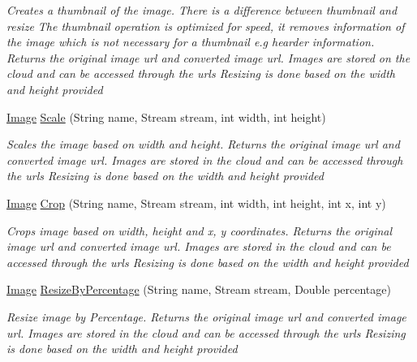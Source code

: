 \begin{DoxyCompactItemize}
\begin{DoxyCompactList}\small\item\em Creates a thumbnail of the image. There is a difference between thumbnail and resize The thumbnail operation is optimized for speed, it removes information of the image which is not necessary for a thumbnail e.\+g hearder information. Returns the original image url and converted image url. Images are stored on the cloud and can be accessed through the urls Resizing is done based on the width and height provided \end{DoxyCompactList}\item 
\hyperlink{classcom_1_1shephertz_1_1app42_1_1paas_1_1sdk_1_1csharp_1_1image_processor_1_1_image}{Image} \hyperlink{classcom_1_1shephertz_1_1app42_1_1paas_1_1sdk_1_1csharp_1_1image_processor_1_1_image_processor_service_aa8a38509c97dc5fa79b39bc99eb52ebe}{Scale} (String name, Stream stream, int width, int height)
\begin{DoxyCompactList}\small\item\em Scales the image based on width and height. Returns the original image url and converted image url. Images are stored in the cloud and can be accessed through the urls Resizing is done based on the width and height provided \end{DoxyCompactList}\item 
\hyperlink{classcom_1_1shephertz_1_1app42_1_1paas_1_1sdk_1_1csharp_1_1image_processor_1_1_image}{Image} \hyperlink{classcom_1_1shephertz_1_1app42_1_1paas_1_1sdk_1_1csharp_1_1image_processor_1_1_image_processor_service_aab2595f6a047ca3b94397cc85ab1a219}{Crop} (String name, Stream stream, int width, int height, int x, int y)
\begin{DoxyCompactList}\small\item\em Crops image based on width, height and x, y coordinates. Returns the original image url and converted image url. Images are stored in the cloud and can be accessed through the urls Resizing is done based on the width and height provided \end{DoxyCompactList}\item 
\hyperlink{classcom_1_1shephertz_1_1app42_1_1paas_1_1sdk_1_1csharp_1_1image_processor_1_1_image}{Image} \hyperlink{classcom_1_1shephertz_1_1app42_1_1paas_1_1sdk_1_1csharp_1_1image_processor_1_1_image_processor_service_a8bb76a9cf8189e3dedcf5cd0dbf6c065}{Resize\+By\+Percentage} (String name, Stream stream, Double percentage)
\begin{DoxyCompactList}\small\item\em Resize image by Percentage. Returns the original image url and converted image url. Images are stored in the cloud and can be accessed through the urls Resizing is done based on the width and height provided \end{DoxyCompactList}\item 

\end{DoxyCompactItemize}
